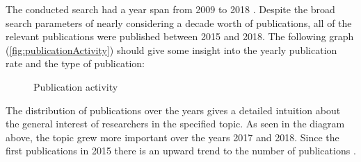 The conducted search had a year span from 2009 to 2018 \cite{waseem:SMSMSADevOps}.
Despite the broad search parameters of nearly considering a decade worth
of publications, all of the relevant publications were published between
2015 and 2018. The following graph (\autoref{fig:publicationActivity})
should give some insight into the yearly publication rate and the type of publication:

\begin{figure}[H]
    \caption{Publication activity}
    \label{fig:publicationActivity}
\end{figure}

The distribution of publications over the years gives a detailed intuition
about the general interest of researchers in the specified topic. As seen
in the diagram above, the topic grew more important over the years 2017 and
2018. Since the first publications in 2015 there is an upward trend to
the number of publications \cite{waseem:SMSMSADevOps}.

